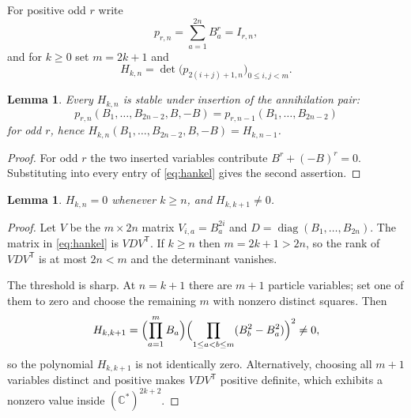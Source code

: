 \documentclass[11pt,reqno]{amsart}
\theoremstyle{plain}
\newtheorem{lemma}[theorem]{Lemma}
\theoremstyle{definition}
\theoremstyle{remark}
\numberwithin{equation}{section}
\begin{document}
For positive odd $r$ write
\begin{equation}
  \label{eq:power-sums}
  p_{r,n}=\sum_{a=1}^{2n}B_a^r=I_{r,n},
\end{equation}
and for $k\ge0$ set $m=2k+1$ and
\begin{equation}
  \label{eq:hankel}
  H_{k,n}=\det\bigl(p_{2(i+j)+1,n}\bigr)_{0\le i,j<m}.
\end{equation}

\begin{lemma}
  \label{lem:stability}
  Every $H_{k,n}$ is stable under insertion of the annihilation pair:
  \begin{equation}
    \label{eq:pair}
    p_{r,n}(B_1,\dots,B_{2n-2},B,-B)=p_{r,n-1}(B_1,\dots,B_{2n-2})
  \end{equation}
  for odd $r$, hence $H_{k,n}(B_1,\dots,B_{2n-2},B,-B)=H_{k,n-1}$.
\end{lemma}

\begin{proof}
  For odd $r$ the two inserted variables contribute $B^r+(-B)^r=0$.
  Substituting into every entry of \eqref{eq:hankel} gives the second
  assertion.
\end{proof}

\begin{lemma}
  \label{lem:vanishing}
  $H_{k,n}=0$ whenever $k\ge n$, and $H_{k,k+1}\ne0$.
\end{lemma}

\begin{proof}
  Let $V$ be the $m\times2n$ matrix $V_{i,a}=B_a^{2i}$ and
  $D=\operatorname{diag}(B_1,\dots,B_{2n})$. The matrix in
  \eqref{eq:hankel} is $VDV^{\mathsf T}$. If $k\ge n$ then $m=2k+1>2n$, so
  the rank of $VDV^{\mathsf T}$ is at most $2n<m$ and the determinant
  vanishes.

  The threshold is sharp. At $n=k+1$ there are $m+1$ particle variables; set
  one of them to zero and choose the remaining $m$ with nonzero distinct
  squares. Then
  \begin{equation}
    \label{eq:witness}
    H_{k,k+1}
    =\Bigl(\prod_{a=1}^{m}B_a\Bigr)
     \Bigl(\prod_{1\le a<b\le m}(B_b^2-B_a^2)\Bigr)^2\ne0,
  \end{equation}
  so the polynomial $H_{k,k+1}$ is not identically zero. Alternatively,
  choosing all $m+1$ variables distinct and positive makes
  $VDV^{\mathsf T}$ positive definite, which exhibits a nonzero value inside
  $(\mathbb C^*)^{2k+2}$.
\end{proof}
\end{document}
